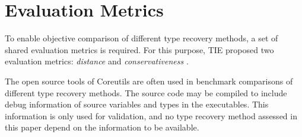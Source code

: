 
\section{Evaluation Metrics}

To enable objective comparison of different type recovery methods, a set of shared evaluation metrics is required. For this purpose, TIE proposed two evaluation metrics: \textit{distance} and \textit{conservativeness} \cite{tie_reverse_engineering_of_types}.

The open source tools of Coreutils are often used in benchmark comparisons of different type recovery methods. The source code may be compiled to include debug information of source variables and types in the executables. This information is only used for validation, and no type recovery method assessed in this paper depend on the information to be available.




